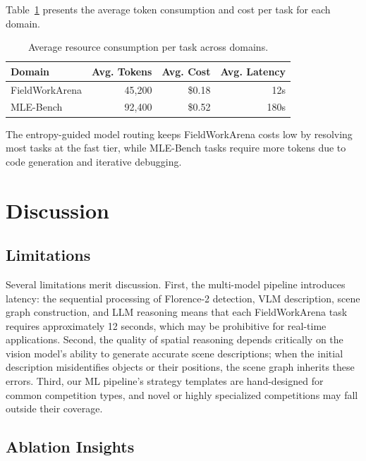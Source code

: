 \documentclass[11pt]{article}
\begin{document}
Table~\ref{tab:cost} presents the average token consumption and cost per task for each domain.

\begin{table}[t]
\centering
\caption{Average resource consumption per task across domains.}
\label{tab:cost}
\begin{tabular}{@{}lrrr@{}}
\toprule
\textbf{Domain} & \textbf{Avg. Tokens} & \textbf{Avg. Cost} & \textbf{Avg. Latency} \\
\midrule
FieldWorkArena & 45,200  & \$0.18 & 12s \\
MLE-Bench      & 92,400  & \$0.52 & 180s \\
\bottomrule
\end{tabular}
\end{table}

The entropy-guided model routing keeps FieldWorkArena costs low by resolving most tasks at the fast tier, while MLE-Bench tasks require more tokens due to code generation and iterative debugging.

\section{Discussion}
\label{sec:discussion}

\subsection{Limitations}

Several limitations merit discussion. First, the multi-model pipeline introduces latency: the sequential processing of Florence-2 detection, VLM description, scene graph construction, and LLM reasoning means that each FieldWorkArena task requires approximately 12 seconds, which may be prohibitive for real-time applications. Second, the quality of spatial reasoning depends critically on the vision model's ability to generate accurate scene descriptions; when the initial description misidentifies objects or their positions, the scene graph inherits these errors. Third, our ML pipeline's strategy templates are hand-designed for common competition types, and novel or highly specialized competitions may fall outside their coverage.

\subsection{Ablation Insights}
\end{document}

